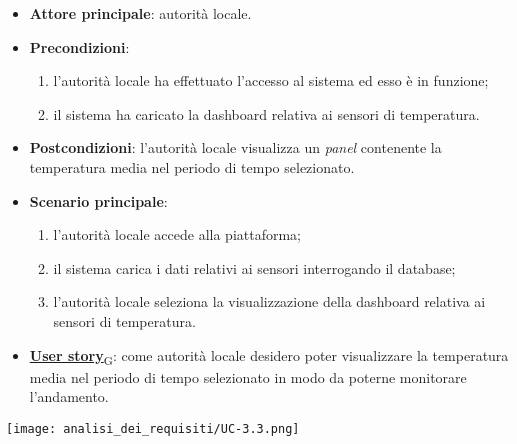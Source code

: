 \begin{itemize}
	\item \textbf{Attore principale}: autorità locale.
	\item \textbf{Precondizioni}:
	      \begin{enumerate}
		      \item l'autorità locale ha effettuato l'accesso al sistema ed esso è in funzione;
		      \item il sistema ha caricato la dashboard relativa ai sensori di temperatura.
	      \end{enumerate}
	\item \textbf{Postcondizioni}: l'autorità locale visualizza un \textit{panel} contenente la temperatura media nel periodo di tempo selezionato.
	\item \textbf{Scenario principale}:
	      \begin{enumerate}
		      \item l'autorità locale accede alla piattaforma;
		      \item il sistema carica i dati relativi ai sensori interrogando il database;
		      \item l'autorità locale seleziona la visualizzazione della dashboard relativa ai sensori di temperatura.
	      \end{enumerate}
	\item \href{https://7last.github.io/docs/rtb/documentazione-interna/glossario\#user-story}{\textbf{User story}\textsubscript{G}}: come autorità locale desidero poter visualizzare la temperatura media nel periodo di tempo selezionato
	      in modo da poterne monitorare l'andamento.
\end{itemize}
\begin{center}
	\texttt{[image: analisi\_dei\_requisiti/UC-3.3.png]}
\end{center}


